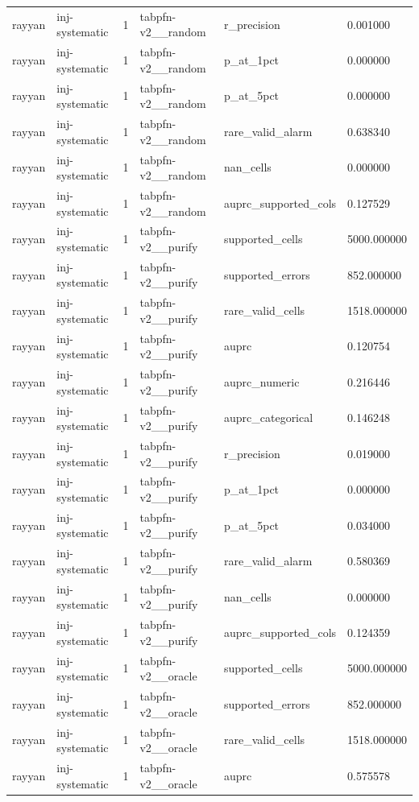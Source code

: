 \begin{tabular}{llllll}
rayyan & inj-systematic & 1 & tabpfn-v2\_\_random & r\_precision & 0.001000 \\
rayyan & inj-systematic & 1 & tabpfn-v2\_\_random & p\_at\_1pct & 0.000000 \\
rayyan & inj-systematic & 1 & tabpfn-v2\_\_random & p\_at\_5pct & 0.000000 \\
rayyan & inj-systematic & 1 & tabpfn-v2\_\_random & rare\_valid\_alarm & 0.638340 \\
rayyan & inj-systematic & 1 & tabpfn-v2\_\_random & nan\_cells & 0.000000 \\
rayyan & inj-systematic & 1 & tabpfn-v2\_\_random & auprc\_supported\_cols & 0.127529 \\
rayyan & inj-systematic & 1 & tabpfn-v2\_\_purify & supported\_cells & 5000.000000 \\
rayyan & inj-systematic & 1 & tabpfn-v2\_\_purify & supported\_errors & 852.000000 \\
rayyan & inj-systematic & 1 & tabpfn-v2\_\_purify & rare\_valid\_cells & 1518.000000 \\
rayyan & inj-systematic & 1 & tabpfn-v2\_\_purify & auprc & 0.120754 \\
rayyan & inj-systematic & 1 & tabpfn-v2\_\_purify & auprc\_numeric & 0.216446 \\
rayyan & inj-systematic & 1 & tabpfn-v2\_\_purify & auprc\_categorical & 0.146248 \\
rayyan & inj-systematic & 1 & tabpfn-v2\_\_purify & r\_precision & 0.019000 \\
rayyan & inj-systematic & 1 & tabpfn-v2\_\_purify & p\_at\_1pct & 0.000000 \\
rayyan & inj-systematic & 1 & tabpfn-v2\_\_purify & p\_at\_5pct & 0.034000 \\
rayyan & inj-systematic & 1 & tabpfn-v2\_\_purify & rare\_valid\_alarm & 0.580369 \\
rayyan & inj-systematic & 1 & tabpfn-v2\_\_purify & nan\_cells & 0.000000 \\
rayyan & inj-systematic & 1 & tabpfn-v2\_\_purify & auprc\_supported\_cols & 0.124359 \\
rayyan & inj-systematic & 1 & tabpfn-v2\_\_oracle & supported\_cells & 5000.000000 \\
rayyan & inj-systematic & 1 & tabpfn-v2\_\_oracle & supported\_errors & 852.000000 \\
rayyan & inj-systematic & 1 & tabpfn-v2\_\_oracle & rare\_valid\_cells & 1518.000000 \\
rayyan & inj-systematic & 1 & tabpfn-v2\_\_oracle & auprc & 0.575578 \\

\end{tabular}
